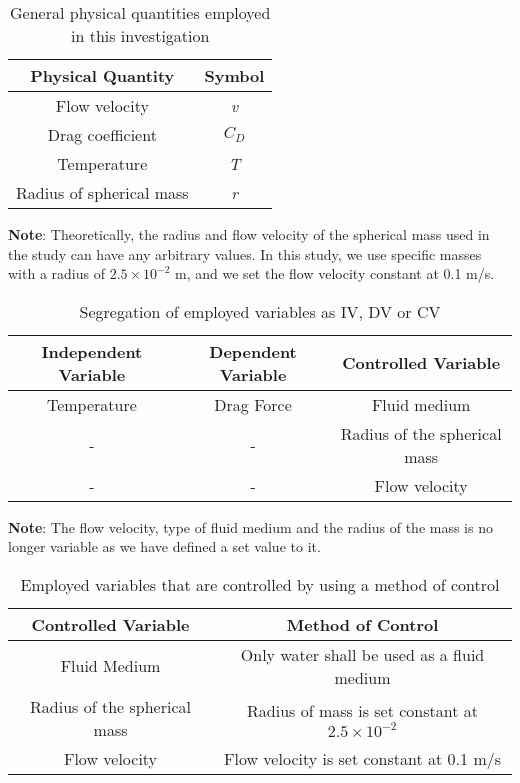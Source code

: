 \begin{table}[H]
    \centering
        \begin{tabular}{|c|c|}
        \hline
        \hline
        {Physical Quantity} & {Symbol} \\
        \hline
        \hline
        {Flow velocity} & \textit{v} \\
        \hline
        {Drag coefficient} & \textit{$C_D$} \\
		\hline        
        {Temperature} & \textit{T} \\
        \hline
        {Radius of spherical mass} & \textit{r} \\
        \hline
        \hline
        \end{tabular}
    \caption{{General physical quantities employed in this investigation}}
\end{table}

{\textbf{Note}: Theoretically, the radius and flow velocity of the spherical mass used in the study can have any arbitrary values. In this study, we use specific masses with a radius of $2.5\times10^{-2}$ m, and we set the flow velocity constant at 0.1 m/s.}

\begin{table}[H]
    \centering
        \begin{tabular}{|c|c|c|}
        \hline
        \hline
        {Independent Variable} & {Dependent Variable} & {Controlled Variable} \\
        \hline
        \hline
        {Temperature} & {Drag Force} & {Fluid medium} \\
        \hline
        {-} & {-} & {Radius of the spherical mass} \\
        \hline
        {-} & {-} & {Flow velocity} \\
        \hline
        \hline
        \end{tabular}
    \caption{{Segregation of employed variables as IV, DV or CV}}
\end{table}

{\textbf{Note}: The flow velocity, type of fluid medium and the radius of the mass is no longer variable as we have defined a set value to it.}

\begin{table}[H]
    \centering
        \begin{tabular}{|c|c|}
        \hline
        \hline
        {Controlled Variable} & {Method of Control} \\
        \hline
        \hline
        {Fluid Medium} & {Only water shall be used as a fluid medium} \\
        \hline
        {Radius of the spherical mass} & {Radius of mass is set constant at $2.5\times 10^{-2}$} \\
		\hline        
        {Flow velocity} & {Flow velocity is set constant at 0.1 m/s} \\
        \hline
        \hline
        \end{tabular}
    \caption{{Employed variables that are controlled by using a method of control}}
\end{table}

